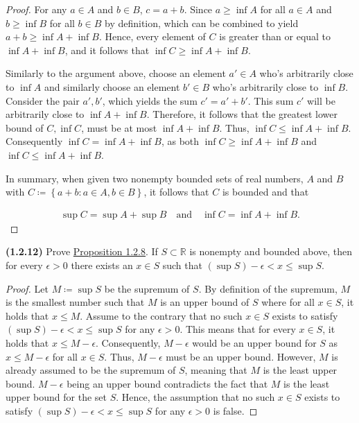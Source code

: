 \documentclass[12pt]{article}
\newcommand{\set}[1]{\left\{ {#1} \right\}}
\newcommand{\bR}{{\mathbb{R}}}
\begin{document}
\begin{proof}
\indent For any $a\in A$ and $b\in B$, $c=a+b$. Since $a\ge \inf A$ for all $a\in A$ and $b\ge\inf B$ for all $b\in B$ by definition, which can be combined to yield $a + b \ge \inf A + \inf B$. Hence, every element of $C$ is greater than or equal to $\inf A + \inf B$, and it follows that $\inf C \ge \inf A + \inf B$.

\indent Similarly to the argument above, choose an element $a'\in A$ who's arbitrarily close to $\inf A$ and similarly choose an element $b'\in B$ who's arbitrarily close to $\inf B$. Consider the pair $a', b'$, which yields the sum $c'=a'+b'$. This sum $c'$ will be arbitrarily close to $\inf A + \inf B$. Therefore, it follows that the greatest lower bound of $C, \inf C$, must be at most $\inf A + \inf B$. Thus, $\inf C \le \inf A + \inf B$. Consequently $\inf C = \inf A + \inf B$, as both $\inf C \ge \inf A + \inf B$ and $\inf C \le \inf A + \inf B$.

\indent In summary, when given two nonempty bounded sets of real numbers, $A$ and $B$ with $C \coloneq \set{a+b : a\in A, b\in B}$, it follows that $C$ is bounded and that

\begin{align*}
	\sup C = \sup A + \sup B \quad \text{and} \quad \inf C = \inf A + \inf B.
\end{align*}

\end{proof}

\newpage

\noindent \textbf{(1.2.12)} Prove \underline{Proposition 1.2.8}. If $S \subset \bR$ is nonempty and bounded above, then for every $\epsilon > 0$ there exists an $x\in S$ such that $(\sup S)-\epsilon < x \le \sup S$.

\begin{proof}
	Let $M\coloneq\sup S$ be the supremum of $S$. By definition of the supremum, $M$ is the smallest number such that $M$ is an upper bound of $S$ where for all $x \in S$, it holds that $x\le M$.
	\indent Assume to the contrary that no such $x\in S$ exists to satisfy $(\sup S)-\epsilon < x \le \sup S$ for any $\epsilon > 0$. This means that for every $x\in S$, it holds that $x\le M -\epsilon$. Consequently, $M-\epsilon$ would be an upper bound for $S$ as $x\le M-\epsilon$ for all $x\in S$. Thus, $M-\epsilon$ must be an upper bound. However, $M$ is already assumed to be the supremum of $S$, meaning that $M$ is the least upper bound. $M-\epsilon$ being an upper bound contradicts the fact that $M$ is the least upper bound for the set $S$. Hence, the assumption that no such $x\in S$ exists to satisfy $(\sup S)-\epsilon < x \le \sup S$ for any $\epsilon > 0$ is false.
	
\end{proof}
\end{document}
